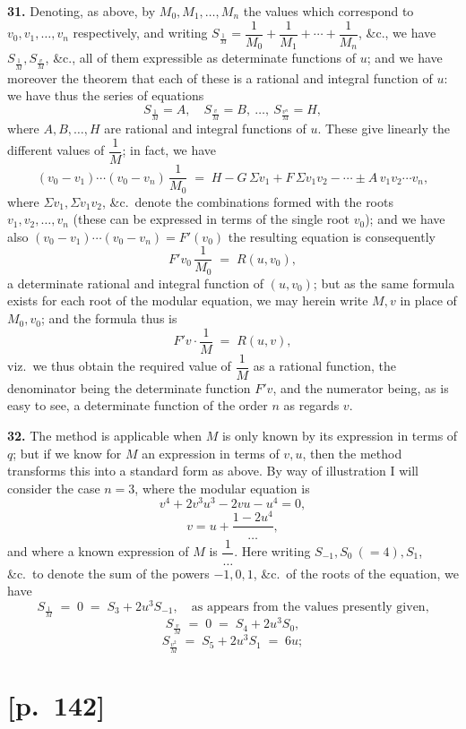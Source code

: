 \documentclass[11pt]{article}
\begin{document}
\textbf{31.} Denoting, as above, by $M_0, M_1, \ldots, M_n$ the values
which correspond to $v_0, v_1, \ldots, v_n$ respectively, and writing
$S_{\frac{1}{M}} = \dfrac{1}{M_0} + \dfrac{1}{M_1} + \cdots + \dfrac{1}{M_n}$,
\&c., we have $S_{\frac{1}{M}}, S_{\frac{v}{M}}$, \&c., all of them
expressible as determinate functions of $u$; and we have moreover the
theorem that each of these is a rational and integral function of $u$: we
have thus the series of equations
\[
S_{\frac{1}{M}} = A,\quad S_{\frac{v}{M}} = B,\ \ldots,\ S_{\frac{v^n}{M}} = H,
\]
where $A, B, \ldots, H$ are rational and integral functions of $u$. These
give linearly the different values of $\dfrac{1}{M}$; in fact, we have
\[
(v_0 - v_1)\cdots(v_0 - v_n)\,\frac{1}{M_0}
\;=\; H - G\,\Sigma v_1 + F\,\Sigma v_1 v_2 - \cdots \pm A\,v_1 v_2 \cdots v_n,
\]
where $\Sigma v_1, \Sigma v_1 v_2$, \&c.\ denote the combinations formed
with the roots $v_1, v_2, \ldots, v_n$ (these can be expressed in terms of
the single root $v_0$); and we have also
$(v_0 - v_1)\cdots(v_0 - v_n) = F'(v_0)$ the resulting equation is
consequently
\[
F' v_0\,\frac{1}{M_0} \;=\; R(u, v_0),
\]
a determinate rational and integral function of $(u, v_0)$; but as the
same formula exists for each root of the modular equation, we may herein
write $M, v$ in place of $M_0, v_0$; and the formula thus is
\[
F'v\cdot\frac{1}{M} \;=\; R(u, v),
\]
viz.\ we thus obtain the required value of $\dfrac{1}{M}$ as a rational
function, the denominator being the determinate function $F'v$, and the
numerator being, as is easy to see, a determinate function of the order
$n$ as regards $v$.

\medskip
\textbf{32.} The method is applicable when $M$ is only known by its
expression in terms of $q$; but if we know for $M$ an expression in terms
of $v, u$, then the method transforms this into a standard form as above.
By way of illustration I will consider the case $n = 3$, where the modular
equation is
\[
v^4 + 2 v^3 u^3 - 2 v u - u^4 = 0,
\]
\[
v = u + \frac{1 - 2u^4}{\ldots},
\]
and where a known expression of $M$ is $\dfrac{1}{\ldots}$. Here writing
$S_{-1}, S_0\ (=4), S_1$, \&c.\ to denote the sum of the powers $-1, 0, 1$,
\&c.\ of the roots of the equation, we have
\[
S_{\frac{1}{M}} \;=\; 0 \;=\; S_3 + 2u^3 S_{-1},\quad\text{as appears from the values presently given,}
\]
\[
S_{\frac{v}{M}} \;=\; 0 \;=\; S_4 + 2u^3 S_0,
\]
\[
S_{\frac{v^2}{M}} \;=\; S_5 + 2u^3 S_1 \;=\; 6u;
\]

\section*{[p.~142]}
\end{document}
